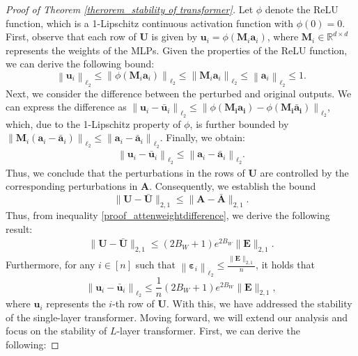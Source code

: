 \begin{proof}[Proof of Theorem \ref{therorem_stability of transformer}]
Let $\phi$ denote the ReLU function, which is a 1-Lipschitz continuous activation function with $\phi(0)=0$. First, observe that each row of $\boldsymbol{U}$ is given by $\boldsymbol{u}_i=\phi\left(\boldsymbol{M}_i \boldsymbol{a}_i\right)$, where $\boldsymbol{M}_i \in \mathbb{R}^{d \times d}$ represents the weights of the MLPs. Given the properties of the ReLU function, we can derive the following bound: 
$$\left\|\boldsymbol{u}_i\right\|_{\ell_2} \leq\left\|\phi\left(\boldsymbol{M}_i \boldsymbol{a}_i\right)\right\|_{\ell_2} \leq\left\|\boldsymbol{M}_i \boldsymbol{a}_i\right\|_{\ell_2} \leq\left\|\boldsymbol{a}_i\right\|_{\ell_2} \leq 1.
$$
Next, we consider the difference between the perturbed and original outputs. We can express the difference as $\left\|\boldsymbol{u}_i-\boldsymbol{\bar{u}}_i\right\|_{\ell_2} \leq\left\|\phi\left(\boldsymbol{M_i} \boldsymbol{a_i}\right)-\phi\left(\boldsymbol{M_i} \boldsymbol{\bar{a}_i}\right)\right\|_{\ell_2}$, which, due to the 1-Lipschitz property of $\phi$, is further bounded by $\left\|\boldsymbol{M}_i\left(\boldsymbol{a}_i-\boldsymbol{\bar{a}}_i\right)\right\|_{\ell_2} \leq\left\|\boldsymbol{a}_i-\boldsymbol{\bar{a}}_i\right\|_{\ell_2}$. Finally, we obtain:
\begin{align}
    \left\|\boldsymbol{u}_i-\boldsymbol{\bar{u}}_i\right\|_{\ell_2} \leq \left\|\boldsymbol{a}_i-\boldsymbol{\bar{a}}_i\right\|_{\ell_2}.
\end{align}
Thus, we conclude that the perturbations in the rows of $\boldsymbol{U}$ are controlled by the corresponding perturbations in $\boldsymbol{A}$. Consequently, we establish the bound 
$$\|\boldsymbol{U}-\boldsymbol{\bar{U}}\|_{2,1} \leq\|\boldsymbol{A}-\bar{\boldsymbol{A}}\|_{2,1}.
$$
Thus, from inequality \ref{proof_attenweightdifference}, we derive the following result:
\begin{align}
    \|\boldsymbol{U}-\boldsymbol{\bar{U}}\|_{2,1} \leq \left(2 B_W+1\right) e^{2 B_W}\|\boldsymbol{E}\|_{2,1}.
\end{align}
Furthermore, for any $i \in[n]$ such that $\left\|\boldsymbol{\varepsilon}_i\right\|_{\ell_2} \leq \frac{\|\boldsymbol{E}\|_{2,1}}{n}$, it holds that 
$$
\left\|\boldsymbol{u}_i-\bar{\boldsymbol{u}}_i\right\|_{\ell_2} \leq \frac{1}{n}(2 B_W+1) e^{2 B_W} \|\boldsymbol{E}\|_{2,1},
$$
where $\boldsymbol{u}_i$ represents the $i$-th row of $\boldsymbol{U}$. With this, we have addressed the stability of the single-layer transformer. Moving forward, we will extend our analysis and focus on the stability of $L$-layer transformer. First, we can derive the following:

\end{proof}
